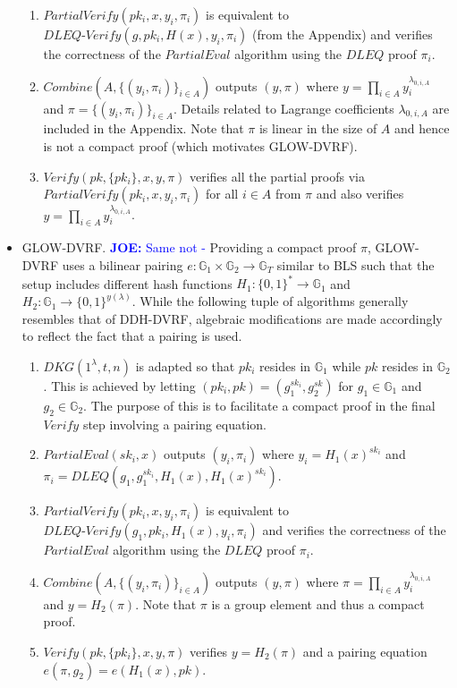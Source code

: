 \documentclass[letterpaper,twocolumn,10pt]{article}
\theoremstyle{definition}
\theoremstyle{remark}
\newcommand{\joenote}[1]{\textcolor{blue}{\textbf{JOE:} #1}}
\begin{document}
\begin{itemize}
\begin{enumerate}
    \item $PartialVerify(pk_i, x, y_i, \pi_i)$ is equivalent to $DLEQ\text{-}Verify(g, pk_i, H(x), y_i, \pi_i)$ (from the Appendix) and verifies the correctness of the $PartialEval$ algorithm using the $DLEQ$ proof $\pi_i$.
    \item $Combine(A, \{(y_i, \pi_i)\}_{i \in A})$ outputs $(y, \pi)$ where $y = \prod_{i \in A} y_i^{\lambda_{0, i, A}}$ and $\pi = \{(y_i, \pi_i)\}_{i \in A}$. Details related to Lagrange coefficients $\lambda_{0, i, A}$ are included in the Appendix. Note that $\pi$ is linear in the size of $A$ and hence is not a compact proof (which motivates GLOW-DVRF).
    \item $Verify(pk, \{pk_i\}, x, y, \pi)$ verifies all the partial proofs via $PartialVerify(pk_i, x, y_i, \pi_i)$ for all $i \in A$ from $\pi$ and also verifies $y = \prod_{i \in A} y_i^{\lambda_{0, i, A}}$.
    \end{enumerate}
\item GLOW-DVRF. \joenote{Same not -} Providing a compact proof $\pi$, GLOW-DVRF uses a bilinear pairing $e: \mathbb{G}_1 \times \mathbb{G}_2 \rightarrow \mathbb{G}_T$ similar to BLS such that the setup includes different hash functions $H_1: \{0, 1\}^* \rightarrow \mathbb{G}_1$ and $H_2: \mathbb{G}_1 \rightarrow \{0, 1\}^{y(\lambda)}$. While the following tuple of algorithms generally resembles that of DDH-DVRF, algebraic modifications are made accordingly to reflect the fact that a pairing is used.
    \begin{enumerate}
    \item $DKG(1^\lambda, t, n)$ is adapted so that $pk_i$ resides in $\mathbb{G}_1$ while $pk$ resides in $\mathbb{G}_2$. This is achieved by letting $(pk_i, pk) = (g_1^{sk_i}, g_2^{sk})$ for $g_1 \in \mathbb{G}_1$ and $g_2 \in \mathbb{G}_2$. The purpose of this is to facilitate a compact proof in the final $Verify$ step involving a pairing equation.
    \item $PartialEval(sk_i, x)$ outputs $(y_i, \pi_i)$ where $y_i = H_1(x)^{sk_i}$ and $\pi_i = DLEQ(g_1, g_1^{sk_i}, H_1(x), H_1(x)^{sk_i})$.
    \item $PartialVerify(pk_i, x, y_i, \pi_i)$ is equivalent to $DLEQ\text{-}Verify(g_1, pk_i, H_1(x), y_i, \pi_i)$ and verifies the correctness of the $PartialEval$ algorithm using the $DLEQ$ proof $\pi_i$.
    \item $Combine(A, \{(y_i, \pi_i)\}_{i \in A})$ outputs $(y, \pi)$ where $\pi = \prod_{i \in A} y_i^{\lambda_{0, i, A}}$ and $y = H_2(\pi)$. Note that $\pi$ is a group element and thus a compact proof.
    \item $Verify(pk, \{pk_i\}, x, y, \pi)$ verifies $y = H_2(\pi)$ and a pairing equation $e(\pi, g_2) = e(H_1(x), pk)$.
    \end{enumerate}
\end{itemize}
\end{document}
